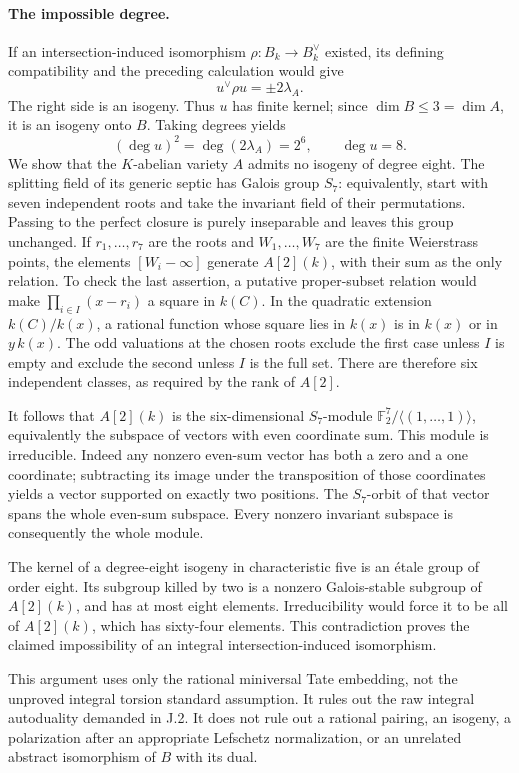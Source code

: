 \paragraph{The impossible degree.}
If an intersection-induced isomorphism $\rho:B_k\to B_k^\vee$
existed, its defining compatibility and the preceding calculation
would give
\[
 u^\vee\rho u=\pm2\lambda_A.
\]
The right side is an isogeny.  Thus $u$ has finite kernel;
since $\dim B\leq3=\dim A$, it is an isogeny onto $B$.
Taking degrees yields
\[
 (\deg u)^2=\deg(2\lambda_A)=2^6,
 \qquad\deg u=8.
\]
We show that the $K$-abelian variety $A$ admits no isogeny of
degree eight.  The splitting field of its generic septic has
Galois group $S_7$: equivalently, start with seven independent
roots and take the invariant field of their permutations.
Passing to the perfect closure is purely inseparable and leaves
this group unchanged.  If $r_1,\ldots,r_7$ are the roots and $W_1,\ldots,W_7$ are the finite
Weierstrass points, the elements $[W_i-\infty]$ generate $A[2](k)$,
with their sum as the only relation.  To check the last assertion,
a putative proper-subset relation would make
$\prod_{i\in I}(x-r_i)$ a square in $k(C)$.  In the quadratic
extension $k(C)/k(x)$, a rational function whose square lies in
$k(x)$ is in $k(x)$ or in $y\,k(x)$.  The odd valuations at the
chosen roots exclude the first case unless $I$ is empty and
exclude the second unless $I$ is the full set.  There are
therefore six independent classes, as required by the rank of
$A[2]$.

It follows that $A[2](k)$ is the six-dimensional $S_7$-module
$\mathbb F_2^7/\langle(1,\ldots,1)\rangle$, equivalently the
subspace of vectors with even coordinate sum.  This module is
irreducible.  Indeed any nonzero even-sum vector has both a zero
and a one coordinate; subtracting its image under the
transposition of those coordinates yields a vector supported
on exactly two positions.  The $S_7$-orbit of that vector spans
the whole even-sum subspace.  Every nonzero invariant subspace
is consequently the whole module.

The kernel of a degree-eight isogeny in characteristic five is
an étale group of order eight.  Its subgroup killed by two is a
nonzero Galois-stable subgroup of $A[2](k)$, and has at most
eight elements.  Irreducibility would force it to be all of
$A[2](k)$, which has sixty-four elements.  This contradiction
proves the claimed impossibility of an integral
intersection-induced isomorphism.

This argument uses only the rational miniversal Tate embedding,
not the unproved integral torsion standard assumption.  It
rules out the raw integral autoduality demanded in J.2.  It does
not rule out a rational pairing, an isogeny, a polarization after
an appropriate Lefschetz normalization, or an unrelated abstract
isomorphism of $B$ with its dual.


